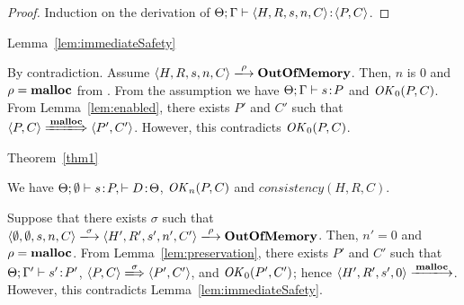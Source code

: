 \begin{proof}
Induction on the derivation of \(\Theta; \Gamma \vdash \langle H, R, s, n, C \rangle \!:\! \langle P, C \rangle\).
\end{proof}

\begin{pfof}{Lemma~\ref{lem:immediateSafety}}

By contradiction.  Assume \(\langle H, R, s, n, C \rangle
\xlongrightarrow{\rho} \OVERFLOW\). Then, \(n\) is \(0\) and \(\rho =
\mathbf{malloc} \) from .  From the assumption we have
\(\Theta;\Gamma \vdash s \!:\! P\) and \(\mathit{OK}_0(P, C)\).  From
Lemma~\ref{lem:enabled}, there exists \(P'\) and \(C'\) such that \(
\langle P, C \rangle \xLongrightarrow{\Malloc} \langle P', C'
\rangle\).  However, this contradicts \(\mathit{OK}_0(P, C)\).

\end{pfof}

\begin{pfof}{Theorem~\ref{thm1}}

We have \(\Theta;\emptyset \vdash s\!:\! P, \vdash D\!:\! \Theta\),
\(\mathit{OK}_n(P, C)\) and  \(consistency(H, R, C)\).

Suppose that there exists \(\sigma\) such that \(\langle \emptyset,
\emptyset, s, n, C\rangle \xlongrightarrow{\sigma} \langle H', R', s',
n', C'\rangle \xlongrightarrow{\rho} \OVERFLOW\).  Then, \(n' = 0\)
and \(\rho = \mathbf{malloc} \).  From Lemma~\ref{lem:preservation}, there
exists \(P'\) and \(C'\) such that \(\Theta; \Gamma' \vdash s' \!:\!
P'\), \( \langle P, C \rangle \xLongrightarrow{\sigma} \langle P', C'
\rangle \), and \(\mathit{OK}_0(P', C')\); hence \(\langle H', R', s',
0\rangle \xlongrightarrow{\Malloc}\).  However, this contradicts
Lemma~\ref{lem:immediateSafety}.

\end{pfof}
